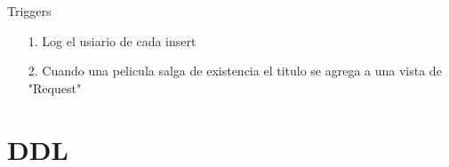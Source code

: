 \documentclass{beamer}%
\begin{document}
\begin{frame}{Triggers}
\begin{itemize}
\item[1.]Log el usiario de cada insert
\item[2.]Cuando una pelicula salga de existencia el titulo se agrega a una vista de "Request"

\end{itemize}

\end{frame}

\section{DDL}
\begin{frame}

\end{frame}
\end{document}
